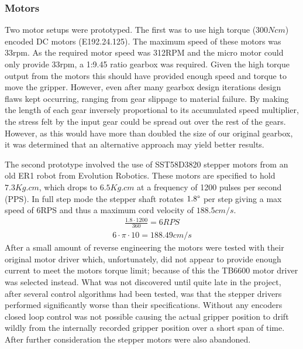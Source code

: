 \documentclass[conference]{IEEEtran}
\begin{document}
	\subsubsection{Motors}
	Two motor setups were prototyped. The first was to use high torque ($300Ncm$) encoded DC motors (E192.24.125). The maximum speed of these motors was 33rpm. As the required motor speed was 312RPM and the micro motor could only provide 33rpm, a 1:9.45 ratio gearbox was required.	Given the high torque output from the motors this should have provided enough speed and torque to move the gripper. However, even after many gearbox design iterations design flaws kept occurring, ranging from gear slippage to material failure. By making the length of each gear inversely proportional to its accumulated speed multiplier, the stress felt by the input gear could be spread out over the rest of the gears. However, as this would have more than doubled the size of our original gearbox, it was determined that an alternative approach may yield better results.
	
	The second prototype involved the use of SST58D3820 stepper motors from an old ER1 robot from Evolution Robotics. These motors are specified to hold $7.3Kg.cm$, which drops to $6.5Kg.cm$ at a frequency of 1200 pulses per second (PPS). In full step mode the stepper shaft rotates $1.8\degree$ per step giving a max speed of 6RPS and thus a maximum cord velocity of $188.5cm/s$. \begin{equation}
	\begin{aligned}
	\frac{1.8\cdot 1200}{360} = 6 RPS
	\end{aligned}
	\end{equation}
	\begin{equation}
	\begin{aligned}
	6\cdot\pi\cdot 10 = 188.49cm/s
	\end{aligned}
	\end{equation} After a small amount of reverse engineering the motors were tested with their original motor driver which, unfortunately, did not appear to provide enough current to meet the motors torque limit; because of this the TB6600 motor driver was selected instead. What was not discovered until quite late in the project, after several control algorithms had been tested, was that the stepper drivers performed significantly worse than their specifications. Without any encoders closed loop control was not possible causing the actual gripper position to drift wildly from the internally recorded gripper position over a short span of time. After further consideration the stepper motors were also abandoned.
	
\end{document}
